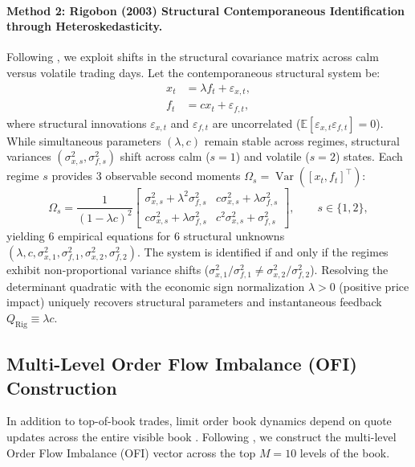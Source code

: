 \documentclass[12pt]{article}
\theoremstyle{definition}
\theoremstyle{remark}
\newcommand{\E}{\mathbb{E}}
\begin{document}
\paragraph{Method 2: Rigobon (2003) Structural Contemporaneous Identification through Heteroskedasticity.}
Following \citet{rigobon2003identification}, we exploit shifts in the structural covariance matrix across calm versus volatile trading days. Let the contemporaneous structural system be:
\begin{align}
x_t &= \lambda f_t + \varepsilon_{x, t}, \\
f_t &= c x_t + \varepsilon_{f, t},
\end{align}
where structural innovations $\varepsilon_{x,t}$ and $\varepsilon_{f,t}$ are uncorrelated ($\E[\varepsilon_{x,t} \varepsilon_{f,t}] = 0$). While simultaneous parameters $(\lambda, c)$ remain stable across regimes, structural variances $(\sigma_{x, s}^2, \sigma_{f, s}^2)$ shift across calm ($s=1$) and volatile ($s=2$) states. Each regime $s$ provides 3 observable second moments $\Omega_s = \operatorname{Var}([x_t, f_t]^\top)$:
\begin{equation}
\Omega_s = \frac{1}{(1 - \lambda c)^2} \begin{bmatrix} \sigma_{x, s}^2 + \lambda^2 \sigma_{f, s}^2 & c \sigma_{x, s}^2 + \lambda \sigma_{f, s}^2 \\ c \sigma_{x, s}^2 + \lambda \sigma_{f, s}^2 & c^2 \sigma_{x, s}^2 + \sigma_{f, s}^2 \end{bmatrix}, \qquad s \in \{1, 2\},
\end{equation}
yielding 6 empirical equations for 6 structural unknowns $(\lambda, c, \sigma_{x,1}^2, \sigma_{f,1}^2, \sigma_{x,2}^2, \sigma_{f,2}^2)$. The system is identified if and only if the regimes exhibit non-proportional variance shifts ($\sigma_{x, 1}^2 / \sigma_{f, 1}^2 \neq \sigma_{x, 2}^2 / \sigma_{f, 2}^2$). Resolving the determinant quadratic with the economic sign normalization $\lambda > 0$ (positive price impact) uniquely recovers structural parameters and instantaneous feedback $Q_{\text{Rig}} \equiv \lambda c$.

\subsection{Multi-Level Order Flow Imbalance (OFI) Construction}
In addition to top-of-book trades, limit order book dynamics depend on quote updates across the entire visible book \citep{cont2014}. Following \citet{cont2014}, we construct the multi-level Order Flow Imbalance (OFI) vector across the top $M=10$ levels of the book.
\end{document}
